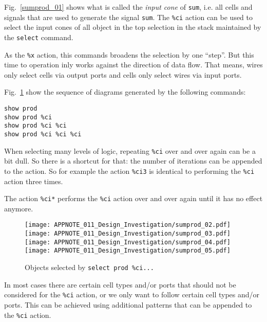 \documentclass[9pt,technote,a4paper]{IEEEtran}
\begin{document}
Fig.~\ref{sumprod_01} shows what is called the {\it input cone\/} of {\tt sum}, i.e.
all cells and signals that are used to generate the signal {\tt sum}. The {\tt \%ci}
action can be used to select the input cones of all object in the top selection
in the stack maintained by the {\tt select} command.

As the {\tt \%x} action, this commands broadens the selection by one "`step"'. But
this time to operation inly works against the direction of data flow. That means,
wires only select cells via output ports and cells only select wires via input ports.

Fig.~\ref{select_prod} show the sequence of diagrams generated by the following
commands:

\begin{verbatim}
show prod
show prod %ci
show prod %ci %ci
show prod %ci %ci %ci
\end{verbatim}

When selecting many levels of logic, repeating {\tt \%ci} over and over again
can be a bit dull. So there is a shortcut for that: the number of iterations
can be appended to the action. So for example the action {\tt \%ci3} is
identical to performing the {\tt \%ci} action three times.

The action {\tt \%ci*} performs the {\tt \%ci} action over and over again until
it has no effect anymore.

\begin{figure}[t]
\hfill \texttt{[image: APPNOTE\_011\_Design\_Investigation/sumprod\_02.pdf]} \\
\texttt{[image: APPNOTE\_011\_Design\_Investigation/sumprod\_03.pdf]} \\
\texttt{[image: APPNOTE\_011\_Design\_Investigation/sumprod\_04.pdf]} \\
\texttt{[image: APPNOTE\_011\_Design\_Investigation/sumprod\_05.pdf]} \\
\caption{Objects selected by {\tt select prod \%ci...}}
\label{select_prod}
\end{figure}

\medskip

In most cases there are certain cell types and/or ports that should not be considered for the {\tt \%ci}
action, or we only want to follow certain cell types and/or ports. This can be achieved using additional
patterns that can be appended to the {\tt \%ci} action.
\end{document}
